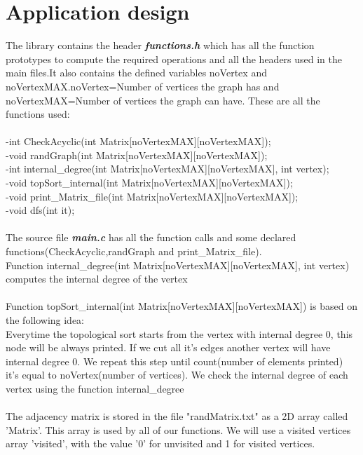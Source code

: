 \documentclass[14pt]{article}
\begin{document}
\section*{Application design}
\vspace{10 mm}
The library contains the header \textbf{\textit{functions.h}} which has all the function prototypes to compute the required operations and all the headers used in the main files.It also contains the defined variables noVertex and noVertexMAX.noVertex=Number of vertices the graph has and noVertexMAX=Number of vertices the graph can have. These are all the functions used:
\\
\\-int CheckAcyclic(int Matrix[noVertexMAX][noVertexMAX]);
\\-void randGraph(int Matrix[noVertexMAX][noVertexMAX]);
\\-int internal\_degree(int Matrix[noVertexMAX][noVertexMAX], int vertex);
\\-void topSort\_internal(int Matrix[noVertexMAX][noVertexMAX]);
\\-void print\_Matrix\_file(int Matrix[noVertexMAX][noVertexMAX]);
\\-void dfs(int it);
\\\vspace{3 mm}
\\The source file \textbf{\textit{main.c}} has all the function calls and some declared functions(CheckAcyclic,randGraph and print\_Matrix\_file).
\\\vspace{3 mm}
Function internal\_degree(int Matrix[noVertexMAX][noVertexMAX], int vertex) computes the internal degree of the vertex
\\\vspace{3 mm}
\\Function topSort\_internal(int Matrix[noVertexMAX][noVertexMAX]) is based on the following idea:
\\Everytime the topological sort starts from the vertex with internal degree 0, this node will be always printed. If we cut all it's edges another vertex will have internal degree 0. We repeat this step until
count(number of elements printed) it's equal to noVertex(number of vertices). We check the internal degree of each vertex using the function internal\_degree
\\\vspace{3 mm}
\\ The adjacency matrix is stored in the file "randMatrix.txt" as a 2D array called 'Matrix'. This array is used by all of our functions. We will use a visited vertices array 'visited', with the value '0' for unvisited and 1 for visited vertices. 
\end{document}
